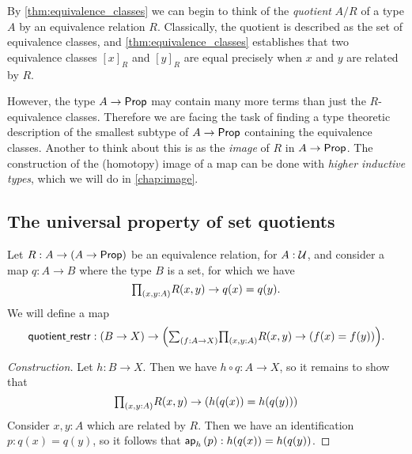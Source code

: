 \begin{rmk}
By \cref{thm:equivalence_classes} we can begin to think of the \emph{quotient} $A/R$ of a type $A$ by an equivalence relation $R$. Classically, the quotient is described as the set of equivalence classes, and \cref{thm:equivalence_classes} establishes that two equivalence classes $[x]_R$ and $[y]_R$ are equal precisely when $x$ and $y$ are related by $R$.

However, the type $A\to\mathsf{Prop}$ may contain many more terms than just the $R$-equivalence classes. Therefore we are facing the task of finding a type theoretic description of the smallest subtype of $A\to\mathsf{Prop}$ containing the equivalence classes.
Another to think about this is as the \emph{image} of $R$ in $A\to \mathsf{Prop}$. 
The construction of the (homotopy) image of a map can be done with \emph{higher inductive types}, which we will do in \cref{chap:image}.
\end{rmk}

\subsection{The universal property of set quotients}

\begin{defn}
Let $R:A\to (A\to \mathsf{Prop})$ be an equivalence relation, for $A:\mathcal{U}$, and consider a map $q:A\to B$ where the type $B$ is a set, for which we have
\begin{equation*}
\prd{x,y:A}R(x,y)\to q(x)=q(y).
\end{equation*}
We will define a map
\begin{equation*}
\quotientrestr:(B\to X) \to \Big(\sm{f:A\to X}\prd{x,y:A}R(x,y)\to (f(x)=f(y))\Big).
\end{equation*}
\end{defn}

\begin{proof}[Construction]
Let $h:B\to X$. Then we have $h\circ q : A\to X$, so it remains to show that
\begin{equation*}
\prd{x,y:A}R(x,y)\to (h(q(x))=h(q(y)))
\end{equation*}
Consider $x,y:A$ which are related by $R$. Then we have an identification $p:q(x)=q(y)$, so it follows that $\mathsf{ap}_{h}\left({p}\right):h(q(x))=h(q(y))$.  
\end{proof}

